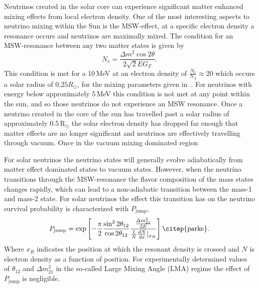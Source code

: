 Neutrinos created in the solar core can experience significant matter enhanced mixing effects from local
electron density.
One of the most interesting aspects to neutrino mixing within the Sun is the MSW-effect,
at a specific electron density a resonance occurs and neutrinos are maximally mixed.
The condition for an MSW-resonance between any two matter states is given by
\begin{equation}
    N_{e} = \frac{\Delta m^{2} \cos2\theta}{2\sqrt{2}EG_{F}}\text{.}
\end{equation}
This condition is met for a 10\,MeV at an electron density
of $\frac{N_{e}}{N_{A}} \approx 20$ which occurs a solar radius of $0.25R_{\odot}$, 
for the mixing parameters given in~\citep{pdg_globalfit}.
For neutrinos with energy below approximately 5\,MeV this condition is not met
at any point within the sun, and so those neutrinos do not experience an MSW
resonance.
Once a neutrino created in the core of the sun has travelled past a solar radius of
approximately 0.5\,$\text{R}_{\odot}$ %
the solar electron density has dropped far enough that matter effects are no longer significant
and neutrinos are effectively travelling through vacuum. Once in the vacuum mixing dominated region

For solar neutrinos the neutrino states will generally evolve adiabatically from
matter effect dominated states to vacuum states.
However, when the neutrino transitions through the MSW-resonance
the flavor composition of the mass states changes rapidly,
which can lead to a non-adiabatic transition
between the mass-1 and mass-2 state.
For solar neutrinos the effect this transition has on the
neutrino survival probability is characterized with $P_{\mathrm{jump}}$,
\begin{equation}
    P_{\mathrm{jump}} = \mathrm{exp}\left[-\dfrac{\pi}{2} \dfrac{\sin^{2}2\theta_{12}}{\cos2\theta_{12}}
               \dfrac{\frac{\Delta m^{2}_{21}}{2E}}{\frac{1}{N} \frac{dN}{dx}|_{x_{R}}}   \right]
\text{\citep{parke}.}
\end{equation}
Where $x_{R}$ indicates the position at which the resonant density is crossed
and $N$ is electron density as a function of position.
For experimentally determined values of $\theta_{12}$ and $\Delta m^{2}_{21}$ in the so-called
Large Mixing Angle (LMA) regime the effect of $P_{\mathrm{jump}}$ is negligible.

